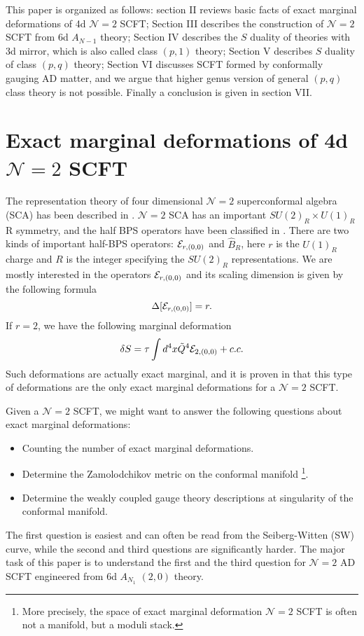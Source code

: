 \documentclass[a4paper,11pt]{article}
\begin{document}
This paper is organized as follows: section II  reviews basic facts of exact marginal deformations of 4d $\mathcal{N}=2$ SCFT; Section III 
describes the construction of $\mathcal{N}=2$ SCFT from  6d $A_{N-1}$ theory; Section IV describes the $S$ duality of  theories with 3d mirror, which is 
also called class $(p,1)$ theory; Section V describes $S$ duality of class $(p,q)$ theory; Section VI  discusses SCFT formed by conformally gauging AD matter, and we 
argue that higher genus version of general $(p,q)$ class theory is not possible. Finally a 
 conclusion is given in section VII.



\section{Exact marginal deformations of 4d $\mathcal{N}=2$ SCFT}
The representation theory of four dimensional $\mathcal{N}=2$ superconformal algebra (SCA) has been described in \cite{Dolan:2002zh}. $\mathcal{N}=2$ SCA  has an 
important $SU(2)_R\times U(1)_R$ R symmetry, and the half BPS operators have been classified in \cite{Dolan:2002zh}. There are two kinds of important half-BPS operators:
${\cal E}_{r,(0,0)}$ and $\hat{B}_R$, here $r$ is the $U(1)_R$ charge and $R$ is the integer specifying the $SU(2)_R$ representations. 
We are mostly interested in the operators ${\cal E}_{r,(0,0)}$ and its scaling dimension is given by the following formula
\begin{equation}
\Delta[{\cal E}_{r,(0,0)}]=r.
\end{equation}
If $r=2$, we have the following marginal deformation 
\begin{equation}
\delta S=\tau \int d^4x \tilde{Q}^4 {\cal E}_{2,(0,0)}+c.c.
\end{equation}
Such deformations are actually exact marginal, and it is proven in \cite{Argyres:2015ffa} that this type of deformations are 
the only exact marginal deformations for a $\mathcal{N}=2$ SCFT. 

Given a $\mathcal{N}=2$ SCFT, we might want to answer the following questions about exact marginal deformations:
\begin{itemize}
\item Counting the number of exact marginal deformations. 
\item Determine the Zamolodchikov metric on the conformal manifold \footnote{More precisely, the space of exact marginal deformation $\mathcal{N}=2$ SCFT is often not a manifold, but a moduli stack.}. 
\item Determine the weakly coupled gauge theory descriptions at  singularity of the conformal manifold.
\end{itemize}
The first question is easiest and can often be read from the Seiberg-Witten (SW) curve, while the second and third questions are significantly harder. The major task of this paper is to understand the 
first and the third question for $\mathcal{N}=2$ AD SCFT engineered from 6d $A_{N_1}$ $(2,0)$ theory.
\end{document}
